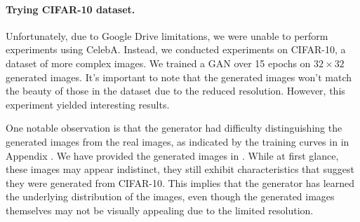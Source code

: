 \paragraph*{Trying CIFAR-10 dataset.}

Unfortunately, due to Google Drive limitations, we were unable to perform experiments using CelebA. Instead, we conducted experiments on CIFAR-10, a dataset of more complex images. We trained a GAN over 15 epochs on $32 \times 32$ generated images. It's important to note that the generated images won't match the beauty of those in the dataset due to the reduced resolution. However, this experiment yielded interesting results.

One notable observation is that the generator had difficulty distinguishing the generated images from the real images, as indicated by the training curves in  in Appendix . We have provided the generated images in . While at first glance, these images may appear indistinct, they still exhibit characteristics that suggest they were generated from CIFAR-10. This implies that the generator has learned the underlying distribution of the images, even though the generated images themselves may not be visually appealing due to the limited resolution.

